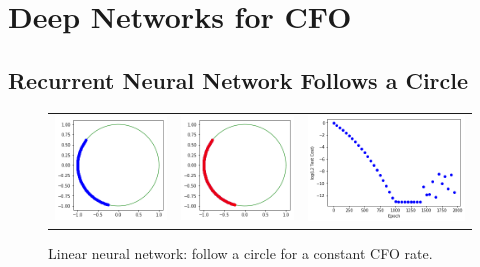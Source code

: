 \chapter{Deep Networks for CFO}

\section{Recurrent Neural Network Follows a Circle}

\setlength{\tabcolsep}{0pt}
\begin{figure}
  \centering
  \caption{Linear neural network: follow a circle for a constant CFO rate.}
  \begin{tabular}{ccc}
    \includegraphics[width=50mm]{figures/follow_circle_linear_before.png}&
    \includegraphics[width=50mm]{figures/follow_circle_linear_after.png}&
    \includegraphics[width=70mm]{figures/follow_circle_linear_loss.png}\\
  \end{tabular}
  \label{fig:circle_constant_rate}
\end{figure}

